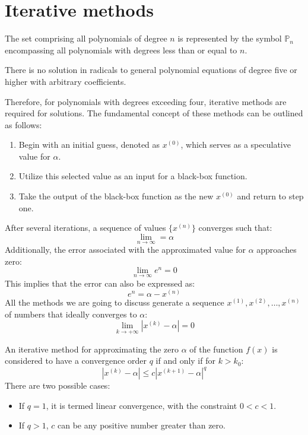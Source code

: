 \section{Iterative methods}

The set comprising all polynomials of degree $n$ is represented by the symbol $\mathbb{P}_n$ encompassing all polynomials with degrees less than or equal to $n$.
\begin{theorem}
    There is no solution in radicals to general polynomial equations of degree five or higher with arbitrary coefficients. 
\end{theorem}
Therefore, for polynomials with degrees exceeding four, iterative methods are required for solutions. 
The fundamental concept of these methods can be outlined as follows:
\begin{enumerate}
    \item Begin with an initial guess, denoted as $x^{(0)}$, which serves as a speculative value for $\alpha$.
    \item Utilize this selected value as an input for a black-box function.
    \item Take the output of the black-box function as the new $x^{(0)}$ and return to step one. 
\end{enumerate}
After several iterations, a sequence of values $\{ x^{(n)} \}$ converges such that:
\[ \lim_{n \rightarrow \infty} = \alpha\]
Additionally, the error associated with the approximated value for $\alpha$ approaches zero:
\[ \lim_{n \rightarrow \infty}e^n = 0\]
This implies that the error can also be expressed as: 
\[e^n=\alpha-x^{(n)}\]
All the methods we are going to discuss generate a sequence $x^{(1)},x^{(2)},\dots,x^{(n)}$ of numbers that ideally converges to $\alpha$:
\[ \lim_{k \rightarrow + \infty} \left\lvert x^{(k)}-\alpha \right\rvert =0\]
\begin{definition}
    An iterative method for approximating the zero $\alpha$ of the function $f(x)$ is considered to have a convergence order $q$ if and only if for $k > k_0$:
    \[\left\lvert x^{(k)} - \alpha \right\rvert \leq c {\left\lvert x^{(k+1)} - \alpha \right\rvert}^q  \]
    There are two possible cases:
    \begin{itemize}
        \item If $q=1$, it is termed linear convergence, with the constraint $0<c<1$.
        \item If $q>1$, $c$ can be any positive number greater than zero.
    \end{itemize}
\end{definition}